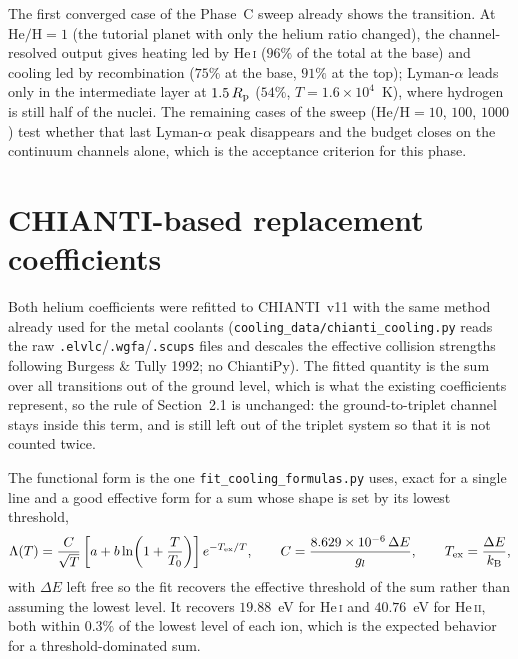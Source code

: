 \documentclass[english,a4paper]{my_memo}
\begin{document}
The first converged case of the Phase~C sweep already shows the transition.
At $\mathrm{He/H} = 1$ (the tutorial planet with only the helium ratio
changed), the channel-resolved output gives heating led by He\,\textsc{i}
($96\%$ of the total at the base) and cooling led by recombination
($75\%$ at the base, $91\%$ at the top); Lyman-$\alpha$ leads only in the
intermediate layer at $1.5\,R_{\rm p}$ ($54\%$, $T = 1.6\times10^4$~K),
where hydrogen is still half of the nuclei. The remaining cases of the sweep
($\mathrm{He/H} = 10$, $100$, $1000$) test whether that last
Lyman-$\alpha$ peak disappears and the budget closes on the continuum
channels alone, which is the acceptance criterion for this phase.

\section{CHIANTI-based replacement coefficients}
\label{sec:chianti}

Both helium coefficients were refitted to CHIANTI~v11 with the same method
already used for the metal coolants
(\texttt{cooling\_data/chianti\_cooling.py} reads the raw
\texttt{.elvlc}/\texttt{.wgfa}/\texttt{.scups} files and descales the
effective collision strengths following Burgess \& Tully 1992; no ChiantiPy).
The fitted quantity is the sum over all transitions out of the ground level,
which is what the existing coefficients represent, so the rule of Section~2.1 is unchanged: the
ground-to-triplet channel stays inside this term, and is still left out of the
triplet system so that it is not counted twice.

The functional form is the one \texttt{fit\_cooling\_formulas.py} uses, exact
for a single line and a good effective form for a sum whose shape is set by
its lowest threshold,
%
\begin{equation}
  \Lambda(T) = \frac{C}{\sqrt{T}}
               \left[a + b\ln\!\left(1 + \frac{T}{T_0}\right)\right]
               e^{-T_{\rm ex}/T},
  \qquad C = \frac{8.629\times10^{-6}\,\Delta E}{g_l},
  \qquad T_{\rm ex} = \frac{\Delta E}{k_{\rm B}},
\end{equation}
%
with $\Delta E$ left free so the fit recovers the effective threshold of the
sum rather than assuming the lowest level. It recovers $19.88$~eV for
He\,\textsc{i} and $40.76$~eV for He\,\textsc{ii}, both within $0.3\%$ of the
lowest level of each ion, which is the expected behavior for a
threshold-dominated sum.
\end{document}
